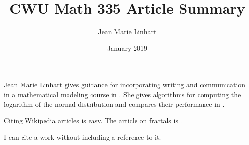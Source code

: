 \documentclass[12pt]{extarticle}
\title{CWU Math 335 Article Summary}
\author{Jean Marie Linhart}
\date{January 2019}
\begin{document}
\maketitle

Jean Marie Linhart gives guidance for incorporating writing and communication in a mathematical modeling course in \cite{Linhart2014}.  She gives algorithms for computing the logarithm of the normal distribution and compares their performance in \cite{Linhart2008}.

Citing Wikipedia articles is easy.  The article on fractals is \cite{fractalwiki}.

I can cite a work without including a reference to it.  \nocite{higham1998handbook}



\end{document}
